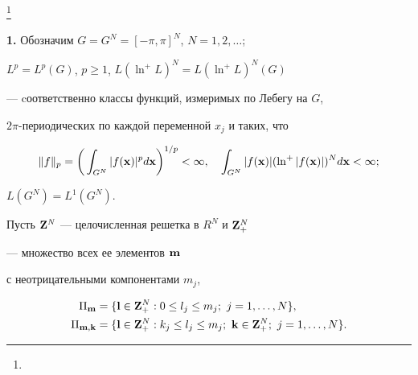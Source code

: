 \thanks{}





\date{}




\pagestyle{plain} %







\maketitle


\label{begin}








\setcounter{section}{1}








{\bf 1.} Обозначим $G=G^N =[-\pi,\pi]^N$, $N=1,2,\dotsc$;


$L^p=L^p(G)$, $p\ge1$, $L(\ln^+L)^{N}=L(\ln^+L)^{N}(G)$


--- cоответственно классы функций, измеримых по Лебегу на $G$, 


$2\pi$-периодических по каждой переменной $x_j$ и таких, что


$$


\|f\|_p=\bigg(\int_{G^N} |f({\bold x})|^p d{\bold x}\bigg)^{1/p}< \infty,


\quad


\int_{G^N} |f({\bold x})|(\ln^+|f({\bold x})|)^{N} d{\bold x}< \infty;


$$


$L(G^N)=L^1 (G^N)$.


Пусть ${\bold Z}^N$ --- целочисленная решетка в $R^N$ и ${\bold Z}_+^N$


--- множество всех ее элементов $\bold {m}$ 


с неотрицательными компонентами $m_j$,


\begin{align*}


\Pi_{\bold m}&=\{{\bold l}\in {\bold Z}_+^N:0\le l_j\le m_j;\ j=1,\dotsc,N\},\\


%


\Pi_{{\bold m},{\bold k}}&=\{{\bold l}\in {\bold Z}_+^N: k_j\le l_j\le m_j; 


\ {\bold k}\in {\bold Z}_+^N;\ j=1,\dotsc,N\}.


\end{align*}






